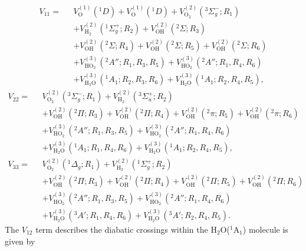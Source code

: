 \documentclass[12pt]{article}
\begin{document}
\begin{equation}
    \begin{split}
        V_{11} = \text{ }& V_{\text{O}}^{(1)}(^1D) + V_{\text{O}}^{(1)}(^1D) + V_{\text{O$_2$}}^{(2)}(^3\Sigma^-_g; R_1)\\& + 
        V_{\text{H}_2}^{(2)}(^1\Sigma^+_g;R_2) + V_{\text{OH}}^{(2)}(^2\Sigma;R_3)\\& +
        V_{\text{OH}}^{(2)}(^2\Sigma;R_4) + V_{\text{OH}}^{(2)}(^2\Sigma;R_5) + V_{\text{OH}}^{(2)}(^2\Sigma;R_6)\\& + 
        V_{\text{HO}_2}^{(3)}(^2A'';R_1,R_3,R_5) + V_{\text{HO}_2}^{(3)}(^2A'';R_1,R_4,R_6)\\& +
        V_{\text{H}_2\text{O}}^{(3)}(^1A_1;R_2,R_3,R_6) + V_{\text{H}_2\text{O}}^{(3)}(^1A_1;R_2,R_4,R_5),
    \end{split}
    \label{eq3x3v11}
\end{equation}
\begin{equation}
    \begin{split}
        V_{22} = \text{ }& V_{\text{O}_2}^{(2)}(^3\Sigma_g^-; R_1) + V_{\text{H}_2}^{(2)}(^3\Sigma_u^+; R_2) \\& + V_{\text{OH}}^{(2)}(^2\Pi;R_3) + V_{\text{OH}}^{(2)}(^2\Pi;R_4) + V_{\text{OH}}^{(2)}(^2\pi;R_5) + V_{\text{OH}}^{(2)}(^2\pi;R_6) \\& + V_{\text{HO}_2}^{(3)}(^2A'';R_1, R_3, R_5) + V_{\text{HO}_2}^{(3)}(^2A'';R_1, R_4, R_6) \\& + V_{\text{H}_2\text{O}}^{(3)}(^1A_1;R_1, R_4, R_6) + V_{\text{H}_2\text{O}}^{(3)}(^1A_1;R_2, R_4, R_5),
    \end{split}
    \label{eq3x3v22}
\end{equation}
\begin{equation}
    \begin{split}
        V_{33} = \text{ }& V_{\text{O}_2}^{(2)}(^1\Delta_g; R_1) + V_{\text{H}_2}^{(2)}(^1\Sigma_g^+; R_2) \\& + V_{\text{OH}}^{(2)}(^2\Pi;R_3) + V_{\text{OH}}^{(2)}(^2\Pi;R_4) + V_{\text{OH}}^{(2)}(^2\Pi;R_5) + V_{\text{OH}}^{(2)}(^2\Pi;R_6) \\& + V_{\text{HO}_2}^{(3)}(^2A'';R_1, R_3, R_5) + V_{\text{HO}_2}^{(3)}(^2A'';R_1, R_4, R_6) \\& + V_{\text{H}_2\text{O}}^{(3)}(^3A';R_1, R_4, R_6) + V_{\text{H}_2\text{O}}^{(3)}(^3A';R_2, R_4, R_5).
    \end{split}
    \label{eq3x3v33}
\end{equation}
The $V_{12}$ term describes the diabatic crossings within the H$_2$O($^1\text{A}_1$) molecule is given by
\end{document}
